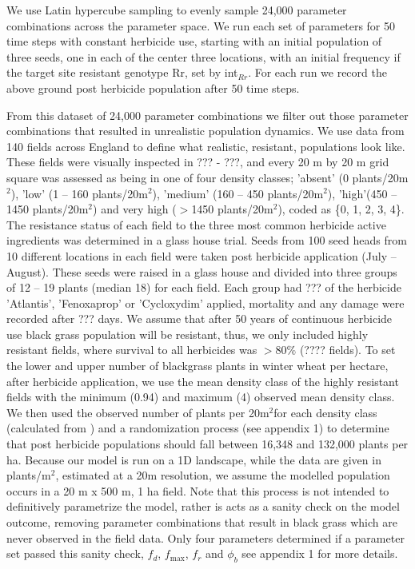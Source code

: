 \documentclass[12pt, a4paper]{article}
\begin{document}
We use Latin hypercube sampling to evenly sample 24,000 parameter combinations across the parameter space. We run each set of parameters for 50 time steps with constant herbicide use, starting with an initial population of three seeds, one in each of the center three locations, with an initial frequency if the target site resistant genotype Rr, set by int$_{Rr}$. For each run we record the above ground post herbicide population after 50 time steps.    

From this dataset of 24,000 parameter combinations we filter out those parameter combinations that resulted in unrealistic population dynamics. We use data from 140 fields across England to define what realistic, resistant, populations look like. These fields were visually inspected in ??? - ???, and every 20 m by 20 m grid square was assessed as being in one of four density classes; 'absent' (0 plants/20m$^2$), 'low' (1 -- 160 plants/20m$^2$), 'medium' (160 -- 450 plants/20m$^2$), 'high'(450 -- 1450 plants/20m$^2$) and very high ($>$1450 plants/20m$^2$), coded as \{0, 1, 2, 3, 4\}. The resistance status of each field to the three most common herbicide active ingredients was determined in a glass house trial. Seeds from 100 seed heads from 10 different locations in each field were taken post herbicide application (July -- August). These seeds were raised in a glass house and divided into three groups of 12 -- 19 plants (median 18) for each field. Each group had ??? of the herbicide 'Atlantis', 'Fenoxaprop' or 'Cycloxydim' applied, mortality and any damage were recorded after ??? days. We assume that after 50 years of continuous herbicide use black grass population will be resistant, thus, we only included highly resistant fields, where survival to all herbicides was $>80\%$ (???? fields). To set the lower and upper number of blackgrass plants in winter wheat per hectare, after herbicide application, we use the mean density class of the highly resistant fields with the minimum (0.94) and maximum (4) observed mean density class. We then used the observed number of plants per 20m$^2$for each density class (calculated from \citealt{Quee2011}) and a randomization process (see appendix 1) to determine that post herbicide populations should fall between 16,348 and 132,000 plants per ha. Because our model is run on a 1D landscape, while the data are given in plants/m$^2$, estimated at a 20m resolution, we assume the modelled population occurs in a 20 m x 500 m, 1 ha field. Note that this process is not intended to definitively parametrize the model, rather is acts as a sanity check on the model outcome, removing parameter combinations that result in black grass which are never observed in the field data. Only four parameters determined if a parameter set passed this sanity check, $f_d$, $f_\text{max}$, $f_r$ and $\phi_b$ see appendix 1 for more details.     
\end{document}
